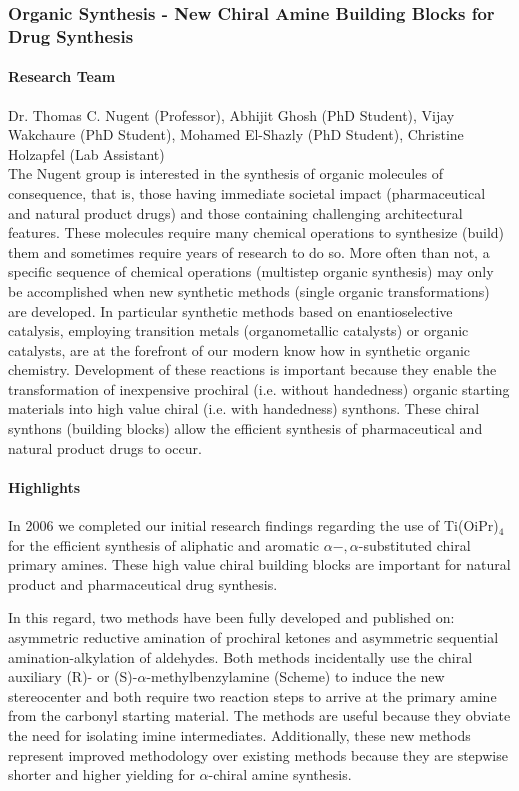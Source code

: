 \subsubsection{Organic Synthesis - New Chiral Amine Building Blocks for Drug Synthesis }

\paragraph{Research Team}
Dr. Thomas C. Nugent (Professor), Abhijit Ghosh (PhD Student), Vijay Wakchaure (PhD
Student), Mohamed El-Shazly (PhD Student), Christine Holzapfel (Lab Assistant) \\

The Nugent group is interested in the synthesis of organic molecules of consequence, that
is, those having immediate societal impact (pharmaceutical and natural product drugs) and
those containing challenging architectural features.  These molecules require many
chemical operations to synthesize (build) them and sometimes require years of research to
do so.  More often than not, a specific sequence of chemical operations (multistep organic
synthesis) may only be accomplished when new synthetic methods (single organic
transformations) are developed.  In particular synthetic methods based on enantioselective
catalysis, employing transition metals (organometallic catalysts) or organic catalysts,
are at the forefront of our modern know how in synthetic organic chemistry.  Development
of these reactions is important because they enable the transformation of inexpensive
prochiral (i.e. without handedness) organic starting materials into high value chiral
(i.e. with handedness) synthons.  These chiral synthons (building blocks) allow the
efficient synthesis of pharmaceutical and natural product drugs to occur.

\paragraph{Highlights}

In 2006 we completed our initial research findings regarding the use of Ti(OiPr)$_4$ for
the efficient synthesis of aliphatic and aromatic $\alpha-,\alpha$-substituted chiral
primary amines. These high value chiral building blocks are important for natural product
and pharmaceutical drug synthesis.

In this regard, two methods have been fully developed and published on: asymmetric
reductive amination of prochiral ketones and asymmetric sequential amination-alkylation of
aldehydes. Both methods incidentally use the chiral auxiliary (R)- or
(S)-$\alpha$-methylbenzylamine (Scheme) to induce the new stereocenter and both require
two reaction steps to arrive at the primary amine from the carbonyl starting material. The
methods are useful because they obviate the need for isolating imine
intermediates. Additionally, these new methods represent improved methodology over
existing methods because they are stepwise shorter and higher yielding for $\alpha$-chiral
amine synthesis.

